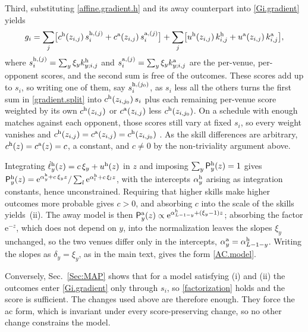 \documentclass[letterpaper,12pt]{article}
\newcommand{\mr}[1]{\mathrm{#1}}
\newcommand{\tnr}[1]{{\textnormal{#1}}}
\newcommand{\mf}[1]{\mathsf{#1}}
\newcommand{\e}{\mr{e}}
\newcommand{\mfP}{\mf{P}}
\begin{document}
Third, %
substituting \eqref{affine.gradient.h} and its away counterpart into \eqref{Gi.gradient} yields
\begin{align}
\label{gradient.split}
    g_i=\sum_j \bigl[c^\tnr{h}(z_{i,j})\,s^{\tnr{h},(j)}_i+c^\tnr{a}(z_{i,j})\,s^{\tnr{a},(j)}_i\bigr]
    +\sum_j \bigl[u^\tnr{h}(z_{i,j})\,k^\tnr{h}_{i,j}+u^\tnr{a}(z_{i,j})\,k^\tnr{a}_{i,j}\bigr],
\end{align}
where $s^{\tnr{h},(j)}_i=\sum_y\xi_y k^\tnr{h}_{y;i,j}$ and $s^{\tnr{a},(j)}_i=\sum_y\xi_y k^\tnr{a}_{y;i,j}$ are the per-venue, per-opponent scores, and the second sum is free of the outcomes. These scores add up to $s_i$, so writing one of them, say $s^{\tnr{h},(j_0)}_i$, as $s_i$ less all the others turns the first sum in \eqref{gradient.split} into $c^\tnr{h}(z_{i,j_0})\,s_i$ plus each remaining per-venue score weighted by its own $c^\tnr{h}(z_{i,j})$ or $c^\tnr{a}(z_{i,j})$ less $c^\tnr{h}(z_{i,j_0})$. On a schedule with enough matches against each opponent, %
those scores still vary at fixed $s_i$, so every weight vanishes and $c^\tnr{h}(z_{i,j})=c^\tnr{a}(z_{i,j})=c^\tnr{h}(z_{i,j_0})$%
. As the skill differences are arbitrary, $c^\tnr{h}(z)=c^\tnr{a}(z)=c$, a constant, and $c\neq0$ by the non-triviality argument above.

Integrating $\dot\ell^\tnr{h}_y(z)=c\,\xi_y+u^\tnr{h}(z)$ in $z$ and imposing $\sum_y\mfP^\tnr{h}_y(z)=1$ gives $\mfP^\tnr{h}_y(z)=\e^{\alpha^\tnr{h}_y+c\,\xi_y z}/\sum_l\e^{\alpha^\tnr{h}_l+c\,\xi_l z}$, with the intercepts $\alpha^\tnr{h}_y$ arising as integration constants, hence unconstrained. Requiring that higher skills make higher outcomes more probable gives $c>0$, and absorbing $c$ into the scale of the skills yields~(ii). The away model is then $\mfP^\tnr{a}_y(z)\propto\e^{\alpha^\tnr{h}_{L-1-y}+(\xi_y-1)z}$; absorbing the factor $\e^{-z}$, which does not depend on $y$, into the normalization leaves the slopes $\xi_y$ unchanged, so the two venues differ only in the intercepts, $\alpha^\tnr{a}_y=\alpha^\tnr{h}_{L-1-y}$. Writing the slopes as $\delta_y=\xi_y$, as in the main text, gives the form \eqref{AC.model}.

Conversely, Sec.~\ref{Sec:MAP} shows that for a model satisfying (i) and (ii) the outcomes enter \eqref{Gi.gradient} only through $s_i$, so \eqref{factorization} holds and the score is sufficient. The changes used above are therefore enough. They force the \gls{ac} form, which is invariant under every score-preserving change, so no other change constrains the model.

\begingroup{}%
\endgroup
\end{document}

